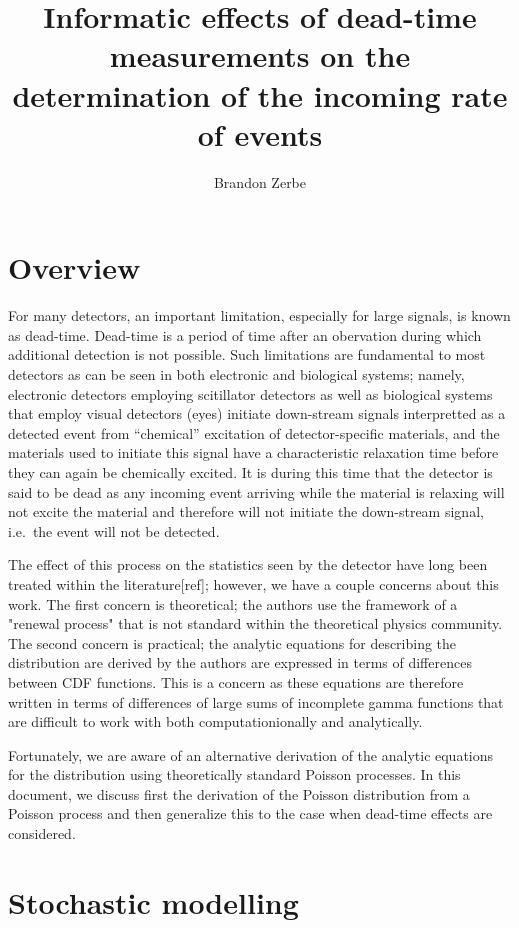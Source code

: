 \documentclass{article}
\title{Informatic effects of dead-time measurements on the determination of the incoming rate of events}
\author{Brandon Zerbe}
\begin{document}
\maketitle

\section{Overview}

For many detectors, an important limitation, especially for
large signals, is
known as dead-time.
Dead-time is a period of time after an obervation during which
additional detection is not possible.  Such
limitations are fundamental to most detectors as can be
seen in both electronic and biological systems; namely,
electronic detectors employing scitillator detectors as well as biological
systems that employ visual detectors (eyes)
initiate down-stream signals interpretted as a detected 
event from ``chemical'' excitation
of detector-specific materials,
and the materials used to initiate this signal
have a characteristic relaxation time before they can again
be chemically excited.  It is during this time that the detector is said to be dead as
any incoming event arriving while the material is relaxing 
will not excite the material and therefore will
not initiate the down-stream signal, i.e.\ the event will not be detected.

The effect of this process on the statistics seen by the detector have
long been treated within the literature[ref]; however, we have a couple
concerns about this work.
The first concern is theoretical; the authors use the framework of
a "renewal process" that is not standard within the theoretical physics community.
The second concern is practical; the analytic equations for describing the
distribution are derived by the authors are expressed 
in terms of differences
between CDF functions.
This is a concern as these equations are therefore
written in terms of differences of large sums of incomplete gamma functions
that are difficult to work with both computationionally and analytically. 

Fortunately, we are aware
of an alternative derivation of the
analytic equations for the distribution using
theoretically standard Poisson processes.
In this document, we discuss first the derivation
of the Poisson distribution from a Poisson process
and then generalize this to the case when dead-time effects
are considered.

\section{Stochastic modelling}\label{sec:Stochastics}
\end{document}
